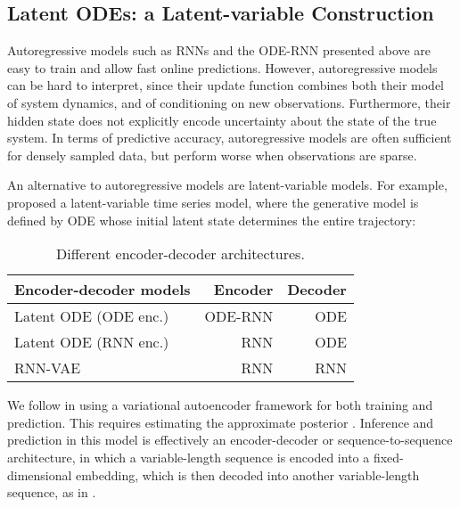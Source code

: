 \documentclass{article}
\begin{document}
\subsection{Latent ODEs: a Latent-variable Construction}



Autoregressive models such as RNNs and the ODE-RNN presented above are easy to train and allow fast online predictions.
However, autoregressive models can be hard to interpret, since their update function combines both their model of system dynamics, and of conditioning on new observations.
Furthermore, their hidden state does not explicitly encode uncertainty about the state of the true system.
In terms of predictive accuracy, autoregressive models are often sufficient for densely sampled data, but perform worse when observations are sparse.

An alternative to autoregressive models are latent-variable models.
For example, \citet{NeuralODE} proposed a latent-variable time series model, where the generative model is defined by ODE whose initial latent state  determines the entire trajectory:













\begin{wraptable}[7]{r}{0.49\textwidth}
\centering
\small
\vspace{-0.5cm}
\begin{tabular}{@{}lrr@{}}\toprule
    \textbf{\small Encoder-decoder models} & Encoder & Decoder \\ \midrule
    Latent ODE (ODE enc.) & ODE-RNN & ODE  \\
    Latent ODE (RNN enc.) & RNN & ODE \\
    RNN-VAE & RNN & RNN\\
    \bottomrule
\end{tabular}
\vspace{0.4mm}
\caption{Different encoder-decoder architectures.}
\label{tab:model_comparison}
\end{wraptable}


We follow \citet{NeuralODE} in using a variational autoencoder framework for both training and prediction.
This requires estimating the approximate posterior .
Inference and prediction in this model is effectively an encoder-decoder or sequence-to-sequence architecture, in which a variable-length sequence is encoded into a fixed-dimensional embedding, which is then decoded into another variable-length sequence, as in \citet{sutskever2014sequence}. 
\end{document}
